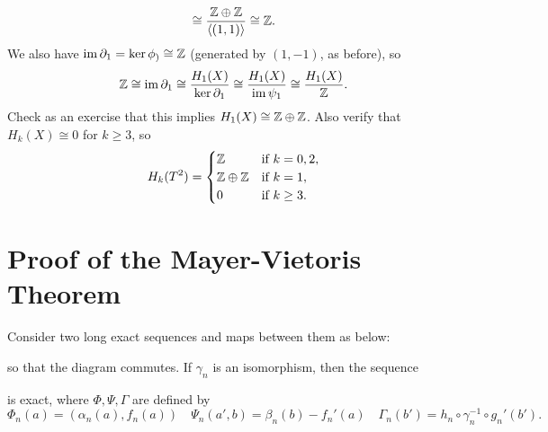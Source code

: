 \begin{example}
\[    \cong \frac{\mathbb{Z} \oplus \mathbb{Z}}{\langle (1, 1) \rangle}
    \cong \mathbb{Z}.
  \]
  We also have $\operatorname{im} \partial_1 = \ker \phi_) \cong \mathbb{Z}$
  (generated by $(1, -1)$, as before), so
  \[
    \mathbb{Z} \cong \operatorname{im} \partial_1 \cong \frac{H_1(X)}{\ker \partial_1}
    \cong \frac{H_1(X)}{\operatorname{im} \psi_1} \cong \frac{H_1(X)}{\mathbb{Z}}.
  \]
  Check as an exercise that this implies
  $H_1(X) \cong \mathbb{Z} \oplus \mathbb{Z}$. Also verify that
  $H_k(X) \cong 0$ for $k \ge 3$, so
  \[
    H_k(T^2) =
    \begin{cases}
      \mathbb{Z} & \text{if } k = 0, 2, \\
      \mathbb{Z} \oplus \mathbb{Z} & \text{if } k = 1, \\
      0 & \text{if } k \ge 3.
    \end{cases}
  \]
\end{example}

\section{Proof of the Mayer-Vietoris Theorem}

\begin{lemma}
  Consider two long exact sequences and maps between them
  as below:
  \begin{center}
  \end{center}
  so that the diagram commutes.
  If $\gamma_n$ is an isomorphism, then the sequence
  \begin{center}
  \end{center}
  is exact, where $\Phi, \Psi, \Gamma$ are defined by
  \[
    \Phi_n(a) = (\alpha_n(a), f_n(a)) \quad
    \Psi_n(a', b) = \beta_n(b) - f_n'(a) \quad
    \Gamma_n(b') = h_n \circ \gamma_n^{-1} \circ g_n'(b').
  \]
\end{lemma}

